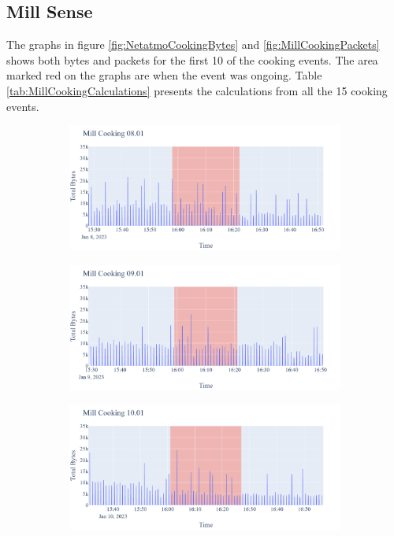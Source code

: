 \subsection{Mill Sense}
The graphs in figure \ref{fig:NetatmoCookingBytes} and \ref{fig:MillCookingPackets} shows both bytes and packets for the first 10 of the cooking events. The area marked red on the graphs are when the event was ongoing. Table \ref{tab:MillCookingCalculations} presents the calculations from all the 15 cooking events. 

\begin{figure}[H]
    \begin{subfigure}[b]{0.5\textwidth}
        \centering
        \includegraphics[width=1.2\hsize]{figures/Mill_Cooking_Bytes_08.01.png}
    \end{subfigure}
    \begin{subfigure}[b]{0.5\textwidth}
        \centering
        \includegraphics[width=1.2\hsize]{figures/Mill_Cooking_Bytes_09.01.png}
    \end{subfigure}
    \begin{subfigure}[b]{0.5\textwidth}
        \centering
        \includegraphics[width=1.2\hsize]{figures/Mill_Cooking_Bytes_10.01.png}

\end{subfigure}
\end{figure}
